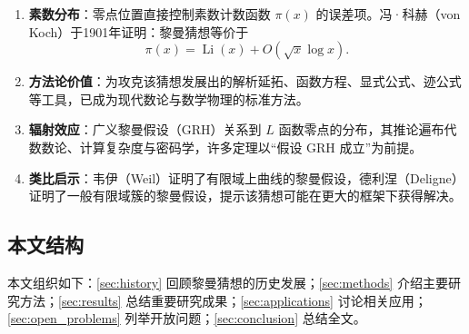 \begin{enumerate}[label=(\arabic*)]
    \item \textbf{素数分布}：零点位置直接控制素数计数函数 $\pi(x)$ 的误差项。冯·科赫（von Koch）于1901年证明\cite{vonkoch1901}：黎曼猜想等价于
    \begin{equation}
        \pi(x) = \operatorname{Li}(x) + O(\sqrt{x} \log x).
    \end{equation}
    \item \textbf{方法论价值}：为攻克该猜想发展出的解析延拓、函数方程、显式公式、迹公式等工具，已成为现代数论与数学物理的标准方法。
    \item \textbf{辐射效应}：广义黎曼假设（GRH）关系到 $L$ 函数零点的分布，其推论遍布代数数论、计算复杂度与密码学，许多定理以“假设 GRH 成立”为前提。
    \item \textbf{类比启示}：韦伊（Weil）证明了有限域上曲线的黎曼假设，德利涅（Deligne）证明了一般有限域簇的黎曼假设\cite{deligne1974weil}，提示该猜想可能在更大的框架下获得解决。
\end{enumerate}

\subsection{本文结构}

本文组织如下：\cref{sec:history} 回顾黎曼猜想的历史发展；\cref{sec:methods} 介绍主要研究方法；\cref{sec:results} 总结重要研究成果；\cref{sec:applications} 讨论相关应用；\cref{sec:open_problems} 列举开放问题；\cref{sec:conclusion} 总结全文。
